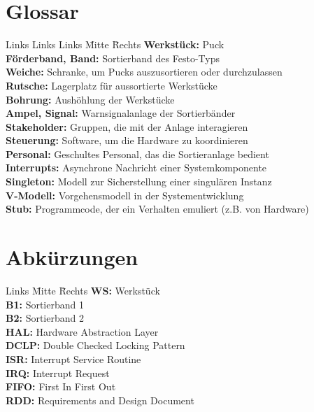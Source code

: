 \documentclass[oneside,a4paper,titlepage]{scrartcl}              %
\begin{document}
\newpage

\section{Glossar}
\begin{tabbing}
  Links Links Links \= Mitte \= Rechts \kill
  \textbf{Werkstück:} \> \>        Puck\\
  \textbf{Förderband, Band:} \> \> Sortierband des Festo-Typs\\
  \textbf{Weiche:}           \> \> Schranke, um Pucks auszusortieren oder durchzulassen\\
  \textbf{Rutsche:}          \> \> Lagerplatz für aussortierte Werkstücke\\
  \textbf{Bohrung:}          \> \> Aushöhlung der Werkstücke\\
  \textbf{Ampel, Signal:}    \> \> Warnsignalanlage der Sortierbänder\\
  \textbf{Stakeholder:}      \> \> Gruppen, die mit der Anlage interagieren\\
  \textbf{Steuerung:}        \> \> Software, um die Hardware zu koordinieren\\
  \textbf{Personal:}         \> \> Geschultes Personal, das die Sortieranlage bedient\\
  \textbf{Interrupts:}       \> \> Asynchrone Nachricht einer Systemkomponente\\
  \textbf{Singleton:}        \> \> Modell zur Sicherstellung einer singulären Instanz\\
  \textbf{V-Modell:}         \> \> Vorgehensmodell in der Systementwicklung\\
  \textbf{Stub:}             \> \> Programmcode, der ein Verhalten emuliert (z.B. von Hardware)\\
  
  
\end{tabbing}


\section{Abkürzungen}
\begin{tabbing}
  Links \= Mitte \= Rechts \kill
  \textbf{WS:}   \> \> Werkstück\\
  \textbf{B1:}   \> \> Sortierband 1\\
  \textbf{B2:}   \> \> Sortierband 2\\
  \textbf{HAL:}  \> \> Hardware Abstraction Layer\\
  \textbf{DCLP:} \> \> Double Checked Locking Pattern\\
  \textbf{ISR:}  \> \> Interrupt Service Routine\\
  \textbf{IRQ:}  \> \> Interrupt Request\\
  \textbf{FIFO:} \> \> First In First Out\\
  \textbf{RDD:}  \> \> Requirements and Design Document\\
  
\end{tabbing}
\end{document}
